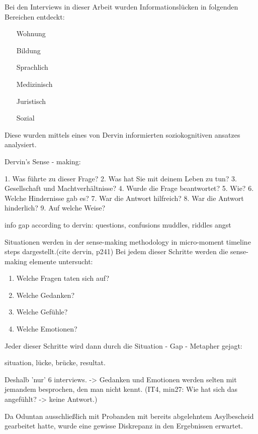 Bei den Interviews in dieser Arbeit wurden Informationslücken in folgenden Bereichen entdeckt:

\begin{enumerate}

	\item[Wohnung]
	\item[Bildung]
	\item[Sprachlich]
	\item[Medizinisch]
	\item[Juristisch]
	\item[Sozial]			%
	
\end{enumerate}

Diese wurden mittels eines von Dervin informierten soziokognitiven ansatzes analysiert.

Dervin's Sense - making:

1. Was führte zu dieser Frage?
2. Was hat Sie mit deinem Leben zu tun?
3. Gesellschaft und Machtverhältnisse?
4. Wurde die Frage beantwortet?
5. Wie?
6. Welche Hindernisse gab es?
7. War die Antwort hilfreich?
8. War die Antwort hinderlich?
9. Auf welche Weise?

info gap according to dervin:
	questions, confusions
	muddles, riddles
	angst				
	
Situationen werden in der sense-making methodology in micro-moment timeline steps dargestellt.(cite dervin, p241) Bei jedem dieser Schritte werden die sense-making elemente untersucht:
\begin{enumerate}
	\item	Welche Fragen taten sich auf?
	\item	Welche Gedanken?
	\item	Welche Gefühle?
	\item 	Welche Emotionen?
\end{enumerate}
Jeder dieser Schritte wird dann durch die Situation - Gap - Metapher gejagt: 

situation, lücke, brücke, resultat.

Deshalb 'nur' 6 interviews. -> Gedanken und Emotionen werden selten mit jemandem besprochen, den man nicht kennt. (IT4, min27: Wie hat sich das angefühlt? -> keine Antwort.)

Da Oduntan ausschließlich mit Probanden mit bereits abgelehntem Asylbescheid gearbeitet hatte, wurde eine gewisse Diskrepanz in den Ergebnissen erwartet.\newline

